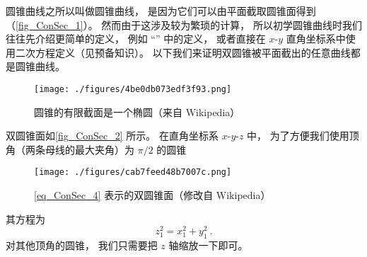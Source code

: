 

圆锥曲线之所以叫做圆锥曲线， 是因为它们可以由平面截取圆锥面得到（\autoref{fig_ConSec_1}）。 然而由于这涉及较为繁琐的计算， 所以初学圆锥曲线时我们往往先介绍更简单的定义， 例如 “” 中的定义， 或者直接在 $x$-$y$ 直角坐标系中使用二次方程定义（见预备知识）。 以下我们来证明双圆锥被平面截出的任意曲线都是圆锥曲线。

\begin{figure}[ht]
\centering
\texttt{[image: ./figures/4be0db073edf3f93.png]}
\caption{圆锥的有限截面是一个椭圆（来自 Wikipedia）} \label{fig_ConSec_1}
\end{figure}

双圆锥面如\autoref{fig_ConSec_2} 所示。 在直角坐标系 $x$-$y$-$z$ 中， 为了方便我们使用顶角（两条母线的最大夹角）为 $\pi/2$ 的圆锥
\begin{figure}[ht]
\centering
\texttt{[image: ./figures/cab7feed48b7007c.png]}
\caption{\autoref{eq_ConSec_4} 表示的双圆锥面（修改自 Wikipedia）} \label{fig_ConSec_2}
\end{figure}
其方程为
\begin{equation}\label{eq_ConSec_4}
z_1^2 = x_1^2 + y_1^2~.
\end{equation}
对其他顶角的圆锥， 我们只需要把 $z$ 轴缩放一下即可。

